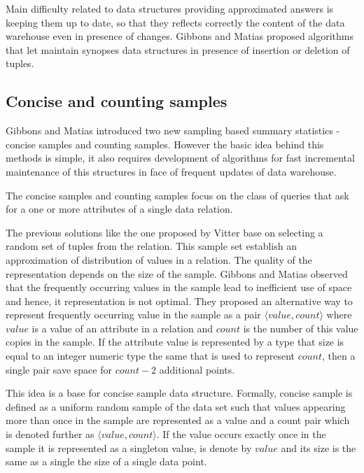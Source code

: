 Main difficulty related to data structures providing approximated answers is
keeping them up to date, so that they reflects correctly the content
of the data warehouse even in presence of changes.
Gibbons and Matias \cite{GM98} proposed algorithms that let
maintain synopses data structures in presence of insertion
or deletion of tuples.


\subsection{Concise and counting samples}
Gibbons and Matias \cite{GM98} introduced two new sampling based summary
statistics - concise samples and counting
  samples. However the basic idea behind this methods is simple, it
also requires development of algorithms for fast incremental
maintenance of this structures in face of frequent updates of data
warehouse.

The concise samples and counting samples focus on the class of queries
that ask for a one or more attributes of a single data relation.

The previous solutions like the one proposed by Vitter \cite{Vit85}
base on selecting a random set of tuples from the relation.
This sample set establish an approximation of distribution of values
in a relation. The quality of the representation depends on the size of
the sample. Gibbons and Matias observed that the frequently occurring values in the
sample lead to inefficient use of space and hence, it representation
is not optimal.
They proposed an alternative way to represent frequently occurring
value in the sample as a pair $\langle value, count \rangle$ where
$value$ is a value of an attribute in a relation and $count$ is the
number of this value copies in the sample. If the attribute value is
represented by a type that size is equal to an integer numeric
type the same that is used to represent $count$, then a single pair
save space for $count - 2$ additional points.

This idea is a base for concise sample data structure. Formally,
concise sample is defined as a uniform
random sample of the data set such that values appearing more than
once in the sample are represented as a value and a count pair which
is denoted further as $\langle value, count \rangle$. If the
value occurs exactly once in the sample it is represented as a
singleton value, is denote by $value$ and its size is the same as a
single the size of a single data point.


